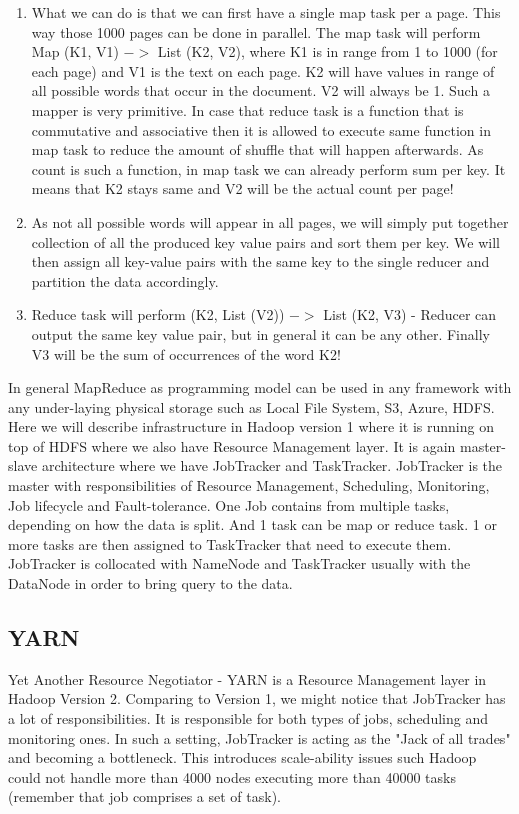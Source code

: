 \begin{enumerate}
	\item What we can do is that we can first have a single map task per a page. This way those 1000 pages can be done in parallel. The map task will perform Map (K1, V1) $->$ List (K2, V2), where K1 is in range from 1 to 1000 (for each page) and V1 is the text on each page. K2 will have values in range of all possible words that occur in the document. V2 will always be 1. Such a mapper is very primitive. In case that reduce task is a function that is commutative and associative then it is allowed to execute same function in map task to reduce the amount of shuffle that will happen afterwards. As count is such a function, in map task we can already perform sum per key. It means that K2 stays same and V2 will be the actual count per page!
	\item As not all possible words will appear in all pages, we will simply put together collection of all the produced key value pairs and sort them per key. We will then assign all key-value pairs with the same key to the single reducer and partition the data accordingly.
	\item Reduce task will perform (K2, List (V2)) $->$ List (K2, V3) - Reducer can output the same key value pair, but in general it can be any other. Finally V3 will be the sum of occurrences of the word K2!
\end{enumerate}
   
In general MapReduce as programming model can be used in any framework with any under-laying physical storage such as Local File System, S3, Azure, HDFS. Here we will describe infrastructure in Hadoop version 1 where it is running on top of HDFS where we also have Resource Management layer. It is again master-slave architecture where we have JobTracker and TaskTracker. JobTracker is the master with responsibilities of Resource Management, Scheduling, Monitoring, Job lifecycle and Fault-tolerance. One Job contains from multiple tasks, depending on how the data is split. And 1 task can be map or reduce task. 1 or more tasks are then assigned to TaskTracker that need to execute them. JobTracker is collocated with NameNode and TaskTracker usually with the DataNode in order to bring query to the data. 

\subsection{YARN}
Yet Another Resource Negotiator -  YARN \cite{YARN} is a Resource Management layer in Hadoop Version 2. Comparing to Version 1, we might notice that JobTracker has a lot of responsibilities. It is responsible for both types of jobs, scheduling and monitoring ones. In such a setting, JobTracker is acting as the "Jack of all trades" and becoming a bottleneck. This introduces scale-ability issues such Hadoop could not handle more than 4000 nodes executing more than 40000 tasks (remember that job comprises a set of task). 

